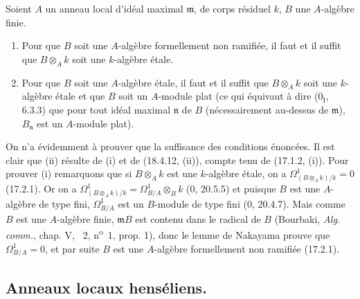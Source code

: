 \begin{corollary}[18.4.14]
\label{IV.18.4.14}
Soient $A$ un anneau local d'idéal maximal $\mathfrak m$, de corps résiduel $k$, $B$ une $A$-algèbre finie.


\begin{enumerate}
  \item[(i)] Pour que $B$ soit une $A$-algèbre formellement non ramifiée, il faut et il suffit que $B\otimes_A k$ soit une $k$-algèbre étale.
  \item[(ii)] Pour que $B$ soit une $A$-algèbre étale, il faut et il suffit que $B\otimes_A k$ soit une $k$-algèbre étale et que $B$ soit un $A$-module plat (ce qui équivaut à dire ($0_{\mathrm I}$, 6.3.3) que pour tout idéal maximal $\mathfrak n$ de $B$ (nécessairement au-dessus de $\mathfrak m$), $B_{\mathfrak n}$ est un $A$-module plat).
\end{enumerate}
\end{corollary}

On n'a évidemment à prouver que la suffisance des conditions énoncées. Il est clair que (ii) résulte de (i) et de (18.4.12, (ii)), compte tenu de (17.1.2, (i)). Pour prouver (i) remarquons que si $B\otimes_A k$ est une $k$-algèbre étale, on a $\Omega^1_{(B\otimes_A k)/k}=0$ (17.2.1). Or on a $\Omega^1_{(B\otimes_A k)/k}=\Omega^1_{B/A}\otimes_B k$ (0, 20.5.5) et puisque $B$ est une $A$-algèbre de type fini, $\Omega^1_{B/A}$ est un $B$-module de type fini (0, 20.4.7). Mais comme $B$ est une $A$-algèbre finie, $\mathfrak mB$ est contenu dans le radical de $B$ (Bourbaki, \emph{Alg. comm.}, chap. V, \textsection~2, n\textsuperscript{o}~1, prop. 1), donc le lemme de Nakayama prouve que $\Omega^1_{B/A}=0$, et par suite $B$ est une $A$-algèbre formellement non ramifiée (17.2.1).

\subsection{Anneaux locaux henséliens\texorpdfstring{\protect\footnotemark}{}.}
\label{subsection:IV.18.5}

